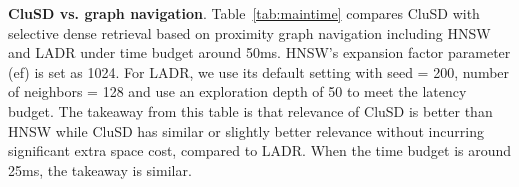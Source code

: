 
\textbf{CluSD vs. graph navigation}. 
Table~\ref{tab:maintime} compares  CluSD with  selective dense retrieval based on proximity graph navigation
including HNSW and LADR under time budget around 50ms.
HNSW's expansion factor parameter (ef) is set as 1024. 
For LADR, we use its default setting with seed = 200, number of neighbors = 128 and use an exploration depth of 50 to meet the latency budget.
The takeaway from this table is that  relevance of CluSD is better than HNSW 
while CluSD has similar or slightly better relevance without incurring  significant  extra
space cost, compared to LADR.
When the time budget is around 25ms, the takeaway is similar.




 



